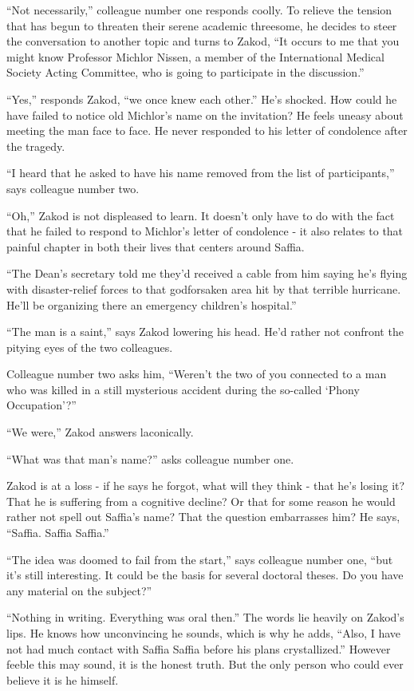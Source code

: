 \documentclass[twoside,11pt]{book}
\begin{document}
``Not necessarily,'' colleague number one responds coolly. To relieve the tension that has
begun to threaten their serene academic threesome, he decides to steer the conversation to another topic and turns to
Zakod, ``It occurs to me that you might know Professor Michlor Nissen, a member of the International
Medical Society Acting Committee, who is going to participate in the discussion.''

``Yes,'' responds Zakod, ``we once knew each other.'' He's shocked.
How could he have failed to notice old Michlor's name on the invitation?  He feels uneasy about meeting the man face
to face. He never responded to his letter of condolence after the tragedy.

``I heard that he asked to have his name removed from the list of participants,'' says
colleague number two.

``Oh,'' Zakod is not displeased to learn. It doesn't only have to do with the fact that he
failed to respond to Michlor's letter of condolence - it also relates to that painful chapter in both their lives that
centers around Saffia.

``The Dean's secretary told me they'd received a cable from him saying he's flying with disaster-relief
forces to that godforsaken area hit by that terrible hurricane. He'll be organizing there an
emergency children's hospital.''

``The man is a saint,'' says Zakod lowering his head. He'd rather not confront the pitying eyes
of the two colleagues.

Colleague number two asks him, ``Weren't the two of you connected to a man who was killed in a still
mysterious accident during the so-called `Phony Occupation'?''

``We were,'' Zakod answers laconically.

``What was that man's name?'' asks colleague number one.

Zakod is at a loss - if he says he forgot, what will they think - that he's losing
 it? That he is suffering from a cognitive decline? Or that for some reason he would
rather not spell out Saffia's name? That the question embarrasses him? He says, ``Saffia. Saffia
Saffia.''

``The idea was doomed to fail from the start,'' says colleague number one, ``but it's still
interesting. It could be the basis for several doctoral theses. Do you have any material on the
subject?''

``Nothing in writing. Everything was oral then.'' The words lie heavily on Zakod's lips. He
knows how unconvincing he sounds, which is why he adds, ``Also, I have not had much contact with Saffia
Saffia before his plans crystallized.'' However feeble this may sound, it is the honest truth. But the
only person who could ever believe it is he himself.
\end{document}
